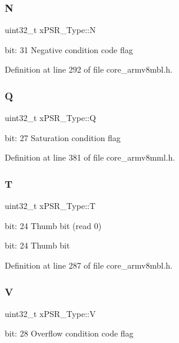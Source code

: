 \subsubsection{\texorpdfstring{N}{N}}
{\footnotesize\ttfamily uint32\+\_\+t x\+P\+S\+R\+\_\+\+Type\+::N}

bit\+: 31 Negative condition code flag 

Definition at line 292 of file core\+\_\+armv8mbl.\+h.

\mbox{\label{unionx_p_s_r___type_add7cbd2b0abd8954d62cd7831796ac7c}} 
\subsubsection{\texorpdfstring{Q}{Q}}
{\footnotesize\ttfamily uint32\+\_\+t x\+P\+S\+R\+\_\+\+Type\+::Q}

bit\+: 27 Saturation condition flag 

Definition at line 381 of file core\+\_\+armv8mml.\+h.

\mbox{\label{unionx_p_s_r___type_a7eed9fe24ae8d354cd76ae1c1110a658}} 
\subsubsection{\texorpdfstring{T}{T}}
{\footnotesize\ttfamily uint32\+\_\+t x\+P\+S\+R\+\_\+\+Type\+::T}

bit\+: 24 Thumb bit (read 0)

bit\+: 24 Thumb bit 

Definition at line 287 of file core\+\_\+armv8mbl.\+h.

\mbox{\label{unionx_p_s_r___type_af14df16ea0690070c45b95f2116b7a0a}} 
\subsubsection{\texorpdfstring{V}{V}}
{\footnotesize\ttfamily uint32\+\_\+t x\+P\+S\+R\+\_\+\+Type\+::V}

bit\+: 28 Overflow condition code flag 

